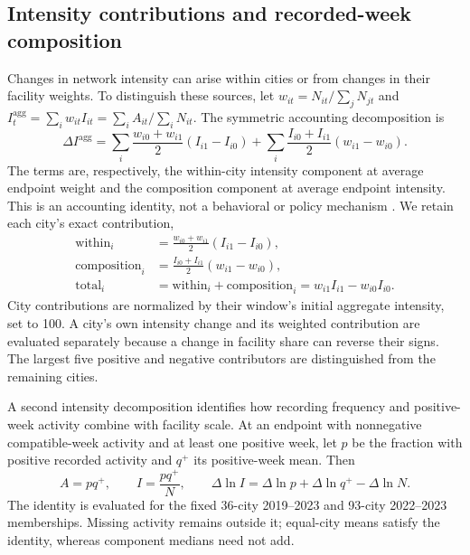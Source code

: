 \subsection{Intensity contributions and recorded-week composition}
Changes in network intensity can arise within cities or from changes in their facility weights. To distinguish these sources, let $w_{it}=N_{it}/\sum_jN_{jt}$ and $I_t^{\mathrm{agg}}=\sum_iw_{it}I_{it}=\sum_iA_{it}/\sum_iN_{it}$.  The symmetric accounting decomposition is
\begin{equation}
 \Delta I^{\mathrm{agg}}=
 \sum_i\frac{w_{i0}+w_{i1}}{2}(I_{i1}-I_{i0})+
 \sum_i\frac{I_{i0}+I_{i1}}{2}(w_{i1}-w_{i0}).
 \label{eq:decomposition}
\end{equation}
The terms are, respectively, the within-city intensity component at average endpoint weight and the composition component at average endpoint intensity.  This is an accounting identity, not a behavioral or policy mechanism \citep{kitagawa1955}.  We retain each city's exact contribution,
\begin{equation}
 \begin{split}
 \mathrm{within}_i&=\frac{w_{i0}+w_{i1}}{2}(I_{i1}-I_{i0}),\\
 \mathrm{composition}_i&=\frac{I_{i0}+I_{i1}}{2}(w_{i1}-w_{i0}),\\
 \mathrm{total}_i&=\mathrm{within}_i+\mathrm{composition}_i
 =w_{i1}I_{i1}-w_{i0}I_{i0}.
 \end{split}
 \label{eq:city-contribution}
\end{equation}
City contributions are normalized by their window's initial aggregate intensity, set to 100. A city's own intensity change and its weighted contribution are evaluated separately because a change in facility share can reverse their signs. The largest five positive and negative contributors are distinguished from the remaining cities.

A second intensity decomposition identifies how recording frequency and positive-week activity combine with facility scale. At an endpoint with nonnegative compatible-week activity and at least one positive week, let $p$ be the fraction with positive recorded activity and $q^{+}$ its positive-week mean.  Then
\begin{equation}
 A=pq^{+},\qquad I=\frac{pq^{+}}{N},\qquad
 \Delta\ln I=\Delta\ln p+\Delta\ln q^{+}-\Delta\ln N.
 \label{eq:weeks}
\end{equation}
The identity is evaluated for the fixed 36-city 2019--2023 and 93-city 2022--2023 memberships.  Missing activity remains outside it; equal-city means satisfy the identity, whereas component medians need not add.

